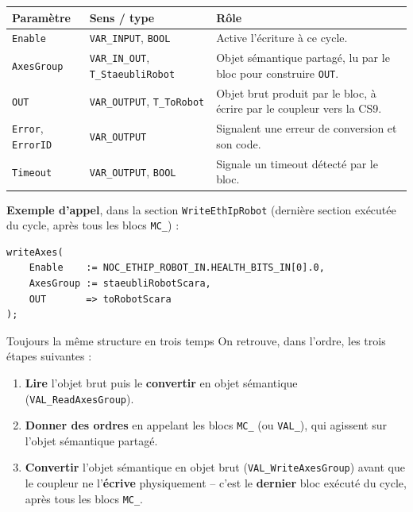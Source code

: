 \begin{center}
\begin{tabular}{|l|l|p{7cm}|}
\hline
\textbf{Paramètre} & \textbf{Sens / type} & \textbf{Rôle} \\
\hline
\texttt{Enable} & \texttt{VAR\_INPUT}, \texttt{BOOL} & Active l'écriture
à ce cycle. \\
\hline
\texttt{AxesGroup} & \texttt{VAR\_IN\_OUT}, \texttt{T\_StaeubliRobot} &
Objet sémantique partagé, lu par le bloc pour construire \texttt{OUT}. \\
\hline
\texttt{OUT} & \texttt{VAR\_OUTPUT}, \texttt{T\_ToRobot} & Objet brut
produit par le bloc, à écrire par le coupleur vers la CS9. \\
\hline
\texttt{Error}, \texttt{ErrorID} & \texttt{VAR\_OUTPUT} & Signalent une
erreur de conversion et son code. \\
\hline
\texttt{Timeout} & \texttt{VAR\_OUTPUT}, \texttt{BOOL} & Signale un
timeout détecté par le bloc. \\
\hline
\end{tabular}
\end{center}

\textbf{Exemple d'appel}, dans la section \texttt{WriteEthIpRobot}
(dernière section exécutée du cycle, après tous les blocs \texttt{MC\_}) :

\begin{lstlisting}
writeAxes(
    Enable    := NOC_ETHIP_ROBOT_IN.HEALTH_BITS_IN[0].0,
    AxesGroup := staeubliRobotScara,
    OUT       => toRobotScara
);
\end{lstlisting}

\begin{UPSTIidee}{Toujours la même structure en trois temps}
On retrouve, dans l'ordre, les trois étapes suivantes :
\begin{enumerate}
    \item \textbf{Lire} l'objet brut puis le \textbf{convertir} en objet
    sémantique (\texttt{VAL\_ReadAxesGroup}).
    \item \textbf{Donner des ordres} en appelant les blocs \texttt{MC\_}
    (ou \texttt{VAL\_}), qui agissent sur l'objet sémantique partagé.
    \item \textbf{Convertir} l'objet sémantique en objet brut
    (\texttt{VAL\_WriteAxesGroup}) avant que le coupleur ne
    l'\textbf{écrive} physiquement -- c'est le \textbf{dernier} bloc
    exécuté du cycle, après tous les blocs \texttt{MC\_}.
\end{enumerate}
\end{UPSTIidee}

